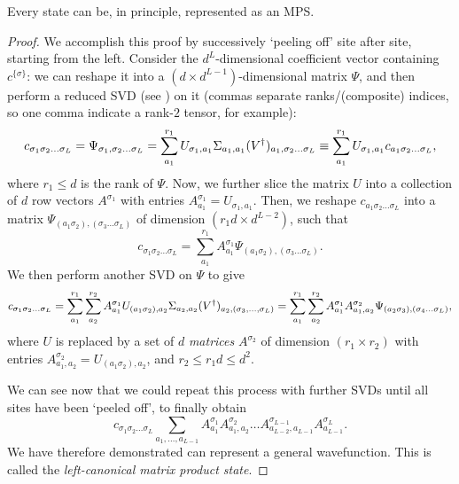 \documentclass{article}
\begin{document}
\begin{theorem}
    Every state can be, in principle, represented as an MPS.
\end{theorem}
\begin{proof}
    We accomplish this proof by successively `peeling off' site after site, starting from the left. Consider the $d^L$-dimensional coefficient vector containing $c^{\{\sigma\}}$: we can reshape it into a $(d\times d^{L-1})$-dimensional matrix $\Psi$, and then perform a reduced SVD (see ) on it (commas separate ranks/(composite) indices, so one comma indicate a rank-$2$ tensor, for example):
    \begin{equation}
        c_{\sigma_1\sigma_2\dots\sigma_L}=\Psi_{\sigma_1,\sigma_2\dots\sigma_L}=\sum^{r_1}_{a_1}U_{\sigma_1,a_1}\Sigma_{a_1,a_1}(V^{\dagger})_{a_1,\sigma_2\dots\sigma_L}\equiv \sum^{r_1}_{a_1} U_{\sigma_1,a_1}c_{a_1\sigma_2\dots\sigma_L},
    \end{equation}    
    where $r_1\leq d$ is the rank of $\Psi$. Now, we further slice the matrix $U$ into a collection of $d$ row vectors $A^{\sigma_1}$ with entries $A_{a_1}^{\sigma_1}=U_{\sigma_1,a_1}$. Then, we reshape $c_{a_1\sigma_2\dots\sigma_L}$ into a matrix $\Psi_{(a_1\sigma_2),(\sigma_3\dots\sigma_L)}$ of dimension $(r_1d\times d^{L-2})$, such that 
    \begin{equation}
        c_{\sigma_1\sigma_2\dots\sigma_L}=\sum_{a_1}^{r_1}A_{a_1}^{\sigma_1}\Psi_{(a_1\sigma_2),(\sigma_3\dots\sigma_L)}.
    \end{equation}
    We then perform another SVD on $\Psi$ to give
    \begin{equation}
        c_{\sigma_1\sigma_2\dots\sigma_L}=\sum_{a_1}^{r_1}\sum_{a_2}^{r_2}A_{a_1}^{\sigma_1}U_{(a_1\sigma_2),a_2}\Sigma_{a_2,a_2}(V^{\dagger})_{a_2,(\sigma_3,\dots,\sigma_L)}=\sum_{a_1}^{r_1}\sum_{a_2}^{r_2}A_{a_1}^{\sigma_1}A_{a_1,a_2}^{\sigma_2}\Psi_{(a_2\sigma_3),(\sigma_4\dots\sigma_L)},
    \end{equation}
    where $U$ is replaced by a set of $d$ \textit{matrices} $A^{\sigma_2}$ of dimension $(r_1\times r_2)$ with entries $A_{a_1,a_2}^{\sigma_2}=U_{(a_1\sigma_2),a_2}$, and $r_2\leq r_1d\leq d^2$.

    We can see now that we could repeat this process with further SVDs until all sites have been `peeled off', to finally obtain
    \begin{equation}
        c_{\sigma_1\sigma_2\dots\sigma_L}\sum_{a_1,\dots,a_{L-1}}A_{a_1}^{\sigma_1}A_{a_1,a_2}^{\sigma_2}\dots A_{a_{L-2},a_{L-1}}^{\sigma_{L-1}}A^{\sigma_L}_{a_{L-1}}.
    \end{equation}
    We have therefore demonstrated  can represent a general wavefunction. This is called the \textit{left-canonical matrix product state}.
\end{proof}
\end{document}
